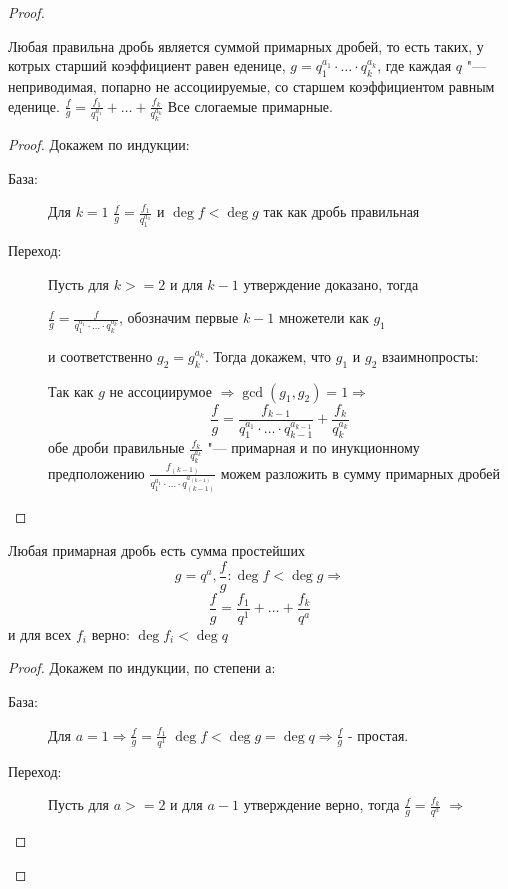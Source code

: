 \begin{theorem}{}
\begin{proof}
\begin{lemma}
Любая правильна дробь является суммой примарных дробей, то есть таких, у котрых старший
коэффициент равен еденице, $g = q_1^{a_1}\cdot\dots\cdot q_k^{a_k}$, где каждая $q$ "--- неприводимая,
попарно не ассоциируемые, со старшем коэффициентом равным еденице.  
$\frac{f}{g} = \frac{f_1}{q_1^{a_1}} + \dots + \frac{f_k}{q_k^{a_{k}}}$
Все слогаемые примарные.
\end{lemma}

\begin{proof}
Докажем по индукции:
\begin{description}
\item[База:] Для $k = 1$
$\frac{f}{g} = \frac{f_1}{q_1^{a_1}}$ и $\deg f < \deg g$ так как дробь правильная
\item[Переход:] Пусть для $k >= 2$ и для $k - 1$ утверждение доказано, тогда

$\frac{f}{g} = \frac{f}{q_1^{a_1}\cdot\dots\cdot q_k^{a_k}}$, обозначим первые $k - 1$ множетели как $g_1$

и соответственно $g_2 = g_k^{a_k}$. Тогда докажем, что $g_1$ и  $g_2$ взаимнопросты:

Так как $g$ не ассоциирумое $\Rightarrow \gcd(g_1, g_2) = 1 \Rightarrow$
$$\frac{f}{g} = \frac{f_{k-1}}{q_1^{a_1}\cdot\dots\cdot q_{k-1}^{a_{k-1}}} + \frac{f_k}{q_k^{a_k}}$$
обе дроби правильные $\frac{f_k}{q_k^{a_k}}$ "--- примарная и по инукционному предположению
$\frac{f_{(k-1)}}{q_1^{a_1}\cdot\dots\cdot q_{(k-1)}^{a_{(k-1)}}}$ можем разложить в сумму примарных дробей  
\end{description}
\end{proof}

\begin{lemma}
Любая примарная дробь есть сумма простейших
$$g = q^a, \frac{f}{g} \colon \deg f < \deg g \Rightarrow$$
$$\frac{f}{g} = \frac{f_1}{q^1} + \dots + \frac{f_k}{q^a}$$
 и для всех $f_i$ верно: $\deg f_i < \deg q$
\end{lemma}

\begin{proof}
Докажем по индукции, по степени $а$:
\begin{description}
\item[База:] Для $a = 1 \Rightarrow \frac{f}{g} = \frac{f_1}{q^1}$
$\deg f < \deg g = \deg q \Rightarrow \frac{f}{g}$ - простая. 
\item[Переход:] Пусть для $a >= 2$ и для $a - 1$ утверждение верно, тогда 
$\frac{f}{g} = \frac{f_k}{q^a}$ $\Rightarrow$
 

\end{description}
\end{proof}
\end{proof}
\end{theorem}
